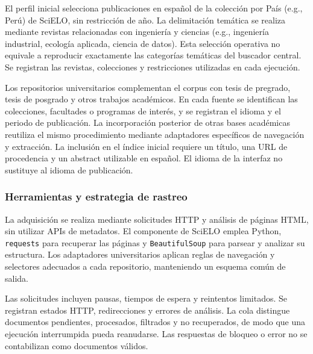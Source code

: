 \documentclass[conference]{IEEEtran}
\begin{document}
El perfil inicial selecciona publicaciones en español de la colección por País (e.g., Perú) de SciELO, sin restricción de año. La delimitación temática se realiza mediante revistas relacionadas con ingeniería y ciencias (e.g., ingeniería industrial, ecología aplicada, ciencia de datos). Esta selección operativa no equivale a reproducir exactamente las categorías temáticas del buscador central. Se registran las revistas, colecciones y restricciones utilizadas en cada ejecución.

Los repositorios universitarios complementan el corpus con tesis de pregrado, tesis de posgrado y otros trabajos académicos. En cada fuente se identifican las colecciones, facultades o programas de interés, y se registran el idioma y el periodo de publicación. La incorporación posterior de otras bases académicas reutiliza el mismo procedimiento mediante adaptadores específicos de navegación y extracción. La inclusión en el índice inicial requiere un título, una URL de procedencia y un abstract utilizable en español. El idioma de la interfaz no sustituye al idioma de publicación.

\subsubsection{Herramientas y estrategia de rastreo}

La adquisición se realiza mediante solicitudes HTTP y análisis de páginas HTML, sin utilizar APIs de metadatos. El componente de SciELO emplea Python, \texttt{requests} para recuperar las páginas y \texttt{BeautifulSoup} para parsear y analizar su estructura. Los adaptadores universitarios aplican reglas de navegación y selectores adecuados a cada repositorio, manteniendo un esquema común de salida.


Las solicitudes incluyen pausas, tiempos de espera y reintentos limitados. Se registran estados HTTP, redirecciones y errores de análisis. La cola distingue documentos pendientes, procesados, filtrados y no recuperados, de modo que una ejecución interrumpida pueda reanudarse. Las respuestas de bloqueo o error no se contabilizan como documentos válidos.
\end{document}
